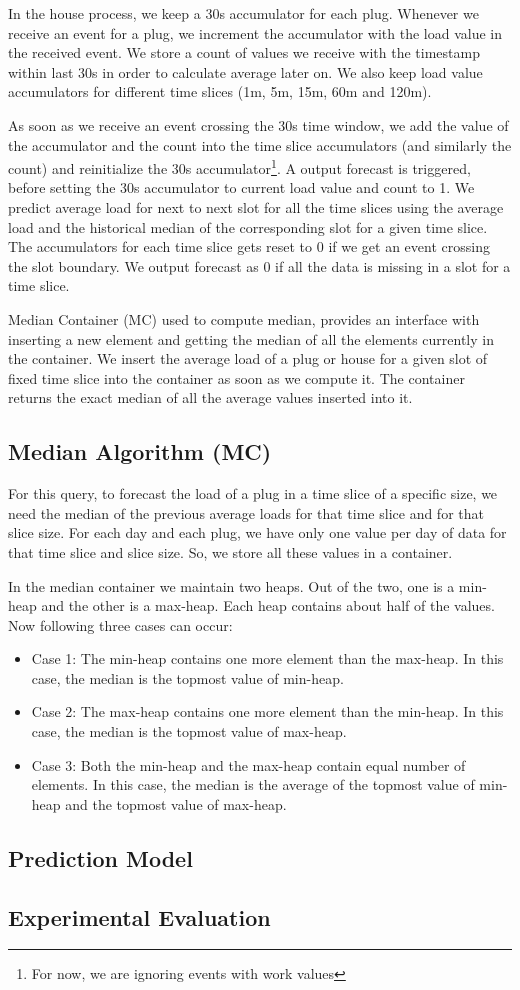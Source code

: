 In the house process, we keep a 30s accumulator for each plug. Whenever we receive an event for a plug, we increment the accumulator with the load value in the received event. We store a count of values we receive with the timestamp within last 30s in order to calculate average later on. We also keep load value accumulators for different time slices (1m, 5m, 15m, 60m and 120m). 

As soon as we receive an event crossing the 30s time window, we add the value of the accumulator and the count into the time slice accumulators (and similarly the count) and reinitialize the 30s accumulator\footnote{For now, we are ignoring events with work values}. A output forecast is triggered, before setting the 30s accumulator to current load value and count to 1. We predict average load for next to next slot for all the time slices using the average load and the historical median of the corresponding slot for a given time slice. The accumulators for each time slice gets reset to 0 if we get an event crossing the slot boundary. We output forecast as 0 if all the data is missing in a slot for a time slice.

Median Container (MC) used to compute median, provides an interface with inserting a new element and getting the median of all the elements currently in the container. We insert the average load of a plug or house for a given slot of fixed time slice into the container as soon as we compute it. The container returns the exact median of all the average values inserted into it.

\subsection{Median Algorithm (MC)}
For this query, to forecast the load of a plug in a time slice of a specific size, we need the median of the previous average loads for that time slice and for that slice size. For each day and each plug, we have only one value per day of data for that time slice and slice size. So, we store all these values in a container.

In the median container we maintain two heaps. Out of the two, one is a min-heap and the other is a max-heap. Each heap contains about half of the values. Now following three cases can occur:
\begin{itemize}
\item Case 1: The min-heap contains one more element than the max-heap. In this case, the median is the topmost value of min-heap.
\item Case 2: The max-heap contains one more element than the min-heap. In this case, the median is the topmost value of max-heap.
\item Case 3: Both the min-heap and the max-heap contain equal number of elements. In this case, the median is the average of the topmost value of min-heap and the topmost value of max-heap.

\end{itemize}

\subsection{Prediction Model}

\subsection{Experimental Evaluation}

